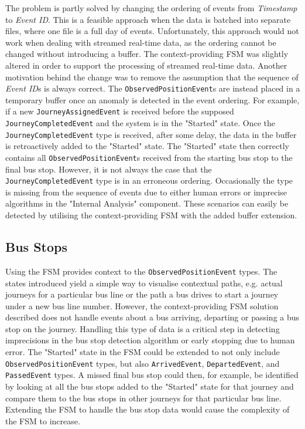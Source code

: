 The problem is partly solved by changing the ordering of events from \textit{Timestamp} to \textit{Event ID}.
This is a feasible approach when the data is batched into separate files, where one file is a full day of events.
Unfortunately, this approach would not work when dealing with streamed real-time data, as the ordering cannot be changed without introducing a buffer.
The context-providing FSM was slightly altered in order to support the processing of streamed real-time data.
Another motivation behind the change was to remove the assumption that the sequence of \textit{Event ID}s is always correct. 
The \texttt{ObservedPositionEvent}s are instead placed in a temporary buffer once an anomaly is detected in the event ordering.
For example, if a new \texttt{JourneyAssignedEvent} is received before the supposed \texttt{JourneyCompletedEvent} and the system is in the "Started" state.
Once the \texttt{JourneyCompletedEvent} type is received, after some delay, the data in the buffer is retroactively added to the "Started" state.
The "Started" state then correctly contains all \texttt{ObservedPositionEvent}s received from the starting bus stop to the final bus stop.
However, it is not always the case that the \texttt{JourneyCompletedEvent} type is in an erroneous ordering.
Occasionally the type is missing from the sequence of events due to either human errors or imprecise algorithms in the "Internal Analysis" component.
These scenarios can easily be detected by utilising the context-providing FSM with the added buffer extension.

\subsection{Bus Stops}
Using the FSM provides context to the \texttt{ObservedPositionEvent} types.
The states introduced yield a simple way to visualise contextual paths, e.g. actual journeys for a particular bus line or the path a bus drives to start a journey under a new bus line number.
However, the context-providing FSM solution described does not handle events about a bus arriving, departing or passing a bus stop on the journey.
Handling this type of data is a critical step in detecting imprecisions in the bus stop detection algorithm or early stopping due to human error.
The "Started" state in the FSM could be extended to not only include \texttt{ObservedPositionEvent} types, but also \texttt{ArrivedEvent}, \texttt{DepartedEvent}, and \texttt{PassedEvent} types.
A missed final bus stop could then, for example, be identified by looking at all the bus stops added to the "Started" state for that journey and compare them to the bus stops in other journeys for that particular bus line.
Extending the FSM to handle the bus stop data would cause the complexity of the FSM to increase.


